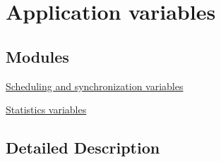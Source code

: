 \hypertarget{group__chaos-test-variables}{\section{Application variables}
\label{group__chaos-test-variables}
}
\subsection*{Modules}
\begin{DoxyCompactItemize}
\item 
\hyperlink{group__chaos-test-variables-sched-sync}{Scheduling and synchronization variables}
\item 
\hyperlink{group__chaos-test-variables-stats}{Statistics variables}
\end{DoxyCompactItemize}


\subsection{Detailed Description}
